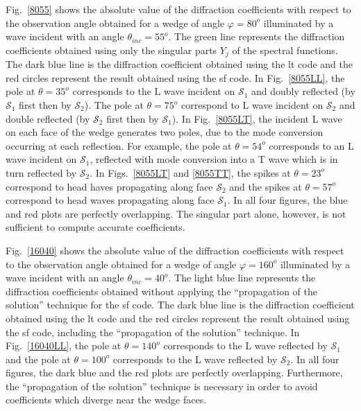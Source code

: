 Fig.~\ref{8055} shows the absolute value of the diffraction coefficients  with respect to the observation angle obtained for a wedge of angle $\varphi=80^o$ illuminated by a wave incident with an angle $\theta_{inc}=55^o$. The green line represents the diffraction coefficients obtained using only the singular parts $Y_j$ of the spectral functions. The dark blue line is the diffraction coefficient obtained using the \acrshort{lt} code and the red circles represent the result obtained using the \acrshort{sf} code. In Fig.~\ref{8055LL}, the pole at $\theta=35^o$ corresponds to the L wave incident on $\mathcal{S}_1$ and doubly reflected (by $\mathcal{S}_1$ first then by $\mathcal{S}_2$). The pole at $\theta=75^o$ correspond to L wave incident on $\mathcal{S}_2$ and double reflected (by $\mathcal{S}_2$ first then by $\mathcal{S}_1$). In Fig.~\ref{8055LT}, the incident L wave on each face of the wedge generates two poles, due to the mode conversion occurring at each reflection. For example, the pole at $\theta=54^o$ corresponds to an L wave incident on $\mathcal{S}_1$, reflected with mode conversion into a T wave which is in turn reflected by $\mathcal{S}_2$. In Figs.~\ref{8055LT} and \ref{8055TT}, the spikes at $\theta=23^o$ correspond to head haves propagating along face $\mathcal{S}_2$ and the spikes at $\theta=57^o$ correspond to head waves propagating along face $\mathcal{S}_1$.
In all four figures, the blue and red plots are perfectly overlapping. The singular part alone, however, is not sufficient to compute accurate coefficients. 

Fig.~\ref{16040} shows the absolute value of the diffraction coefficients with respect to the observation angle obtained for a wedge of angle $\varphi=160^o$ illuminated by a wave incident with an angle $\theta_{inc}=40^o$. The light blue line represents the diffraction coefficients obtained without applying the ``propagation of the solution'' technique for the \acrshort{sf} code. The dark blue line is the diffraction coefficient obtained using the \acrshort{lt} code and the red circles represent the result obtained using the \acrshort{sf} code, including the ``propagation of the solution'' technique. In Fig.~\ref{16040LL}, the pole at $\theta=140^o$ corresponds to the L wave reflected by $\mathcal{S}_1$ and the pole at $\theta=100^o$ corresponds to the L wave reflected by $\mathcal{S}_2$. In all four figures, the dark blue and the red plots are perfectly overlapping. Furthermore, the ``propagation of the solution'' technique is necessary in order to avoid coefficients which diverge near the wedge faces. 

